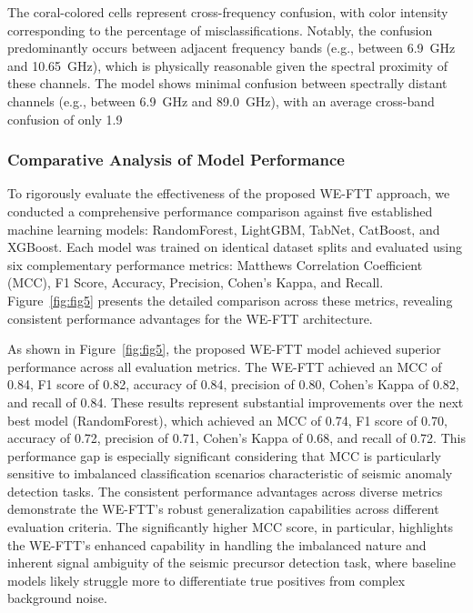 \documentclass[preprint,review,12pt,authoryear]{elsarticle}
\begin{document}
The coral-colored cells represent cross-frequency confusion, with color intensity corresponding to the percentage of misclassifications. Notably, the confusion predominantly occurs between adjacent frequency bands (e.g., between 6.9~GHz and 10.65~GHz), which is physically reasonable given the spectral proximity of these channels. The model shows minimal confusion between spectrally distant channels (e.g., between 6.9~GHz and 89.0~GHz), with an average cross-band confusion of only 1.9%

\subsubsection{Comparative Analysis of Model Performance}
To rigorously evaluate the effectiveness of the proposed WE-FTT approach, we conducted a comprehensive performance comparison against five established machine learning models: RandomForest, LightGBM, TabNet, CatBoost, and XGBoost. Each model was trained on identical dataset splits and evaluated using six complementary performance metrics: Matthews Correlation Coefficient (MCC), F1 Score, Accuracy, Precision, Cohen's Kappa, and Recall. Figure~\ref{fig:fig5} presents the detailed comparison across these metrics, revealing consistent performance advantages for the WE-FTT architecture.

As shown in Figure~\ref{fig:fig5}, the proposed WE-FTT model achieved superior performance across all evaluation metrics. The WE-FTT achieved an MCC of 0.84, F1 score of 0.82, accuracy of 0.84, precision of 0.80, Cohen's Kappa of 0.82, and recall of 0.84. These results represent substantial improvements over the next best model (RandomForest), which achieved an MCC of 0.74, F1 score of 0.70, accuracy of 0.72, precision of 0.71, Cohen's Kappa of 0.68, and recall of 0.72. This performance gap is especially significant considering that MCC is particularly sensitive to imbalanced classification scenarios characteristic of seismic anomaly detection tasks. The consistent performance advantages across diverse metrics demonstrate the WE-FTT's robust generalization capabilities across different evaluation criteria. The significantly higher MCC score, in particular, highlights the WE-FTT's enhanced capability in handling the imbalanced nature and inherent signal ambiguity of the seismic precursor detection task, where baseline models likely struggle more to differentiate true positives from complex background noise.
\end{document}
